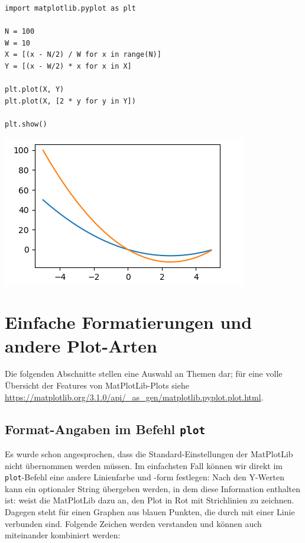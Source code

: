 \begin{codebox}[Beispiel: Zwei Graphen im selben Plot, width=.55\linewidth, nobeforeafter, equal height group = grpXmpSimplePlotTwoFunc]
\begin{verbatim}
import matplotlib.pyplot as plt

N = 100
W = 10
X = [(x - N/2) / W for x in range(N)]
Y = [(x - W/2) * x for x in X]

plt.plot(X, Y)
plt.plot(X, [2 * y for y in Y])

plt.show()
\end{verbatim}
\end{codebox}
%
\begin{tcolorbox}[title=Ausgabe: Zwei Graphen im selben Plot, width=.45\linewidth, nobeforeafter, equal height group = grpXmpSimplePlotTwoFunc]
	\includegraphics[width=\linewidth]{./gfx/plt-twoFuncs}
\end{tcolorbox}

\section{Einfache Formatierungen und andere Plot-Arten}
Die folgenden Abschnitte stellen eine Auswahl an Themen dar; für eine volle Übersicht der Features von MatPlotLib-Plots siehe \url{https://matplotlib.org/3.1.0/api/_as_gen/matplotlib.pyplot.plot.html}.

\subsection{Format-Angaben im Befehl \texttt{plot}}
Es wurde schon angesprochen, dass die Standard-Einstellungen der MatPlotLib nicht übernommen werden müssen. Im einfachsten Fall können wir direkt im \texttt{plot}-Befehl eine andere Linienfarbe und -form festlegen: Nach den Y-Werten kann ein optionaler String übergeben werden, in dem diese Information enthalten ist:
weist die MatPlotLib dazu an, den Plot in Rot mit Strichlinien zu zeichnen. Dagegen steht
für einen Graphen aus blauen Punkten, die durch mit einer Linie verbunden sind. Folgende Zeichen werden verstanden und können auch miteinander kombiniert werden:

